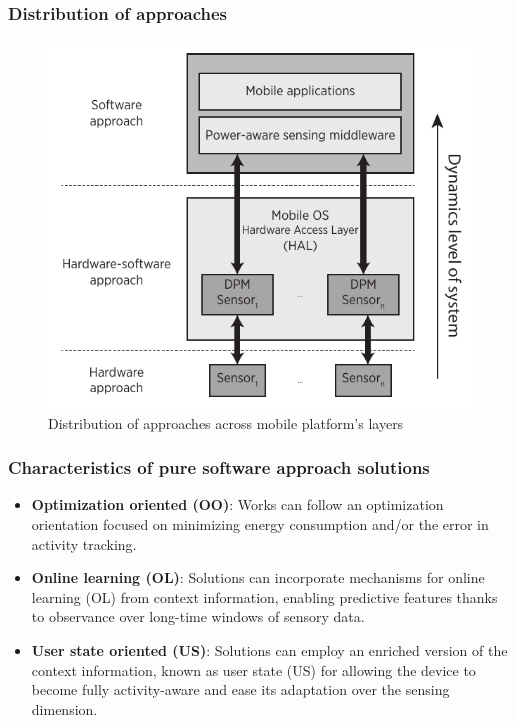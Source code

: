 \documentclass[compress,9pt,xcolor={dvipsnames,table}]{beamer}
\begin{document}
\begin{frame}\frametitle{Distribution of approaches}
\begin{figure}[tb]
  \centering
  \includegraphics[scale=0.6]{../../../resources/images/vectors/approaches-distribution}
  \caption{Distribution of approaches across mobile platform's layers}
  \label{fig:distribution}
\end{figure}
\end{frame}


\begin{frame}[t]\frametitle{Characteristics of pure software approach solutions}
\begin{tcolorbox}[title=Distinctive characteristics of pure software solutions,colframe=PineGreen]
\small
\begin{itemize}
  \item \textbf{Optimization oriented (OO)}: Works can follow an optimization orientation focused on minimizing energy consumption and/or the error in activity tracking.
  \item \textbf{Online learning (OL)}: Solutions can incorporate mechanisms for online learning (OL) from context information, enabling predictive features thanks to observance over long-time windows of sensory data.
  \item \textbf{User state oriented (US)}: Solutions can employ an enriched version of the context information, known as user state (US) for allowing the device to become fully activity-aware and ease its adaptation over the sensing dimension.
\end{itemize}
\end{tcolorbox}
\end{frame}
\end{document}
